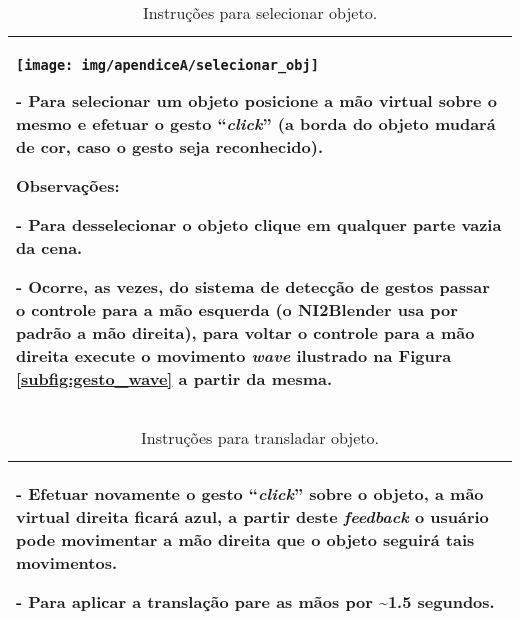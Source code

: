 \begin{table}[!htbp]
\caption{Instruções para selecionar objeto.}
\label{tab:instrucoes_selecionar_objeto}
\begin{center}
\begin{tabular}{| p{14cm} |}
\hline

\begin{center}
\texttt{[image: img/apendiceA/selecionar\_obj]}
\end{center}

- Para selecionar um objeto posicione a mão virtual sobre o mesmo e efetuar o gesto ``\textit{click}'' (a borda do objeto mudará de cor, caso o gesto seja reconhecido).

\textbf{Observações:} 

- Para desselecionar o objeto clique em qualquer parte vazia da cena. 

- Ocorre, as vezes, do sistema de detecção de gestos passar o controle para a mão esquerda (o NI2Blender usa por padrão a mão direita), para voltar o controle para a mão direita execute o movimento \textit{wave} ilustrado na Figura \ref{subfig:gesto_wave} a partir da mesma.
\tabularnewline
\hline

\end{tabular}
\end{center}
\end{table}

\begin{table}[!htbp]
\caption{Instruções para transladar objeto.}
\label{tab:instrucoes_transladar_objeto}
\begin{center}
\begin{tabular}{| p{14cm} |}
\hline

- Efetuar novamente o gesto ``\textit{click}'' sobre o objeto, a mão virtual direita ficará azul, a partir deste \textit{feedback} o usuário pode movimentar a mão direita que o objeto seguirá tais movimentos.

- Para aplicar a translação pare as mãos por \textasciitilde 1.5 segundos.
\tabularnewline
\hline

\end{tabular}
\end{center}
\end{table}

